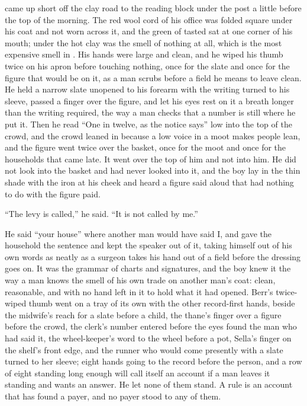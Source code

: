 came up short off the clay road to the reading block under the post a little before the top of the morning. The red wool cord of his office was folded square under his coat and not worn across it, and the green of tasted  sat at one corner of his mouth; under the hot clay was the smell of nothing at all, which is the most expensive smell in . His hands were large and clean, and he wiped his thumb twice on his apron before touching nothing, once for the slate and once for the figure that would be on it, as a man scrubs before a field he means to leave clean. He held a narrow slate unopened to his forearm with the writing turned to his sleeve, passed a finger over the figure, and let his eyes rest on it a breath longer than the writing required, the way a man checks that a number is still where he put it. Then he read “One in twelve, as the notice says” low into the top of the crowd, and the crowd leaned in because a low voice in a moot makes people lean, and the figure went twice over the basket, once for the moot and once for the households that came late. It went over the top of him and not into him. He did not look into the basket and had never looked into it, and the boy lay in the thin shade with the iron at his cheek and heard a figure said aloud that had nothing to do with the figure paid.

“The levy is called,” he said. “It is not called by me.”

He said “your house” where another man would have said I, and gave the household the sentence and kept the speaker out of it, taking himself out of his own words as neatly as a surgeon takes his hand out of a field before the dressing goes on. It was the grammar of charts and signatures, and the boy knew it the way a man knows the smell of his own trade on another man's coat: clean, reasonable, and with no hand left in it to hold what it had opened. Berr's twice-wiped thumb went on a tray of its own with the other record-first hands, beside the midwife's reach for a slate before a child, the thane's finger over a figure before the crowd, the clerk's number entered before the eyes found the man who had said it, the wheel-keeper's word to the wheel before a pot, Sella's finger on the shelf's front edge, and the runner who would come presently with a slate turned to her sleeve; eight hands going to the record before the person, and a row of eight standing long enough will call itself an account if a man leaves it standing and wants an answer. He let none of them stand. A rule is an account that has found a payer, and no payer stood to any of them.

